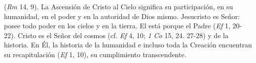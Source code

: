   (\emph{Rm} 14, 9). La Ascensión de Cristo al Cielo significa su participación, en su humanidad, en el poder y en la autoridad de Dios mismo. Jesucristo es Señor: posee todo poder en los cielos y en la tierra. El está  porque el Padre  (\emph{Ef} 1, 20-22). Cristo es el Señor del cosmos (cf. \emph{Ef} 4, 10; \emph{1 Co} 15, 24. 27-28) y de la historia. En Él, la historia de la humanidad e incluso toda la Creación encuentran su recapitulación (\emph{Ef} 1, 10), su cumplimiento transcendente.